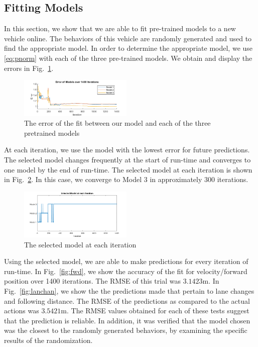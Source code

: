 \documentclass[letterpaper, 10 pt, conference]{ieeeconf}  %
\begin{document}
\subsection{Fitting Models}

In this section, we show that we are able to fit pre-trained models to a new vehicle online. The behaviors of this vehicle are randomly generated and used to find the appropriate model. In order to determine the appropriate model, we use \eqref{eq:pnorm} with each of the three pre-trained models. We obtain and display the errors in Fig.~\ref{fig:error}.

\begin{figure}[ht]
    \includegraphics[width=0.48\textwidth]{fig/modelerror.png}
    \caption{The error of the fit between our model and each of the three pretrained models} \label{fig:error}
\end{figure}

At each iteration, we use the model with the lowest error for future predictions. The selected model changes frequently at the start of run-time and converges to one model by the end of run-time. The selected model at each iteration is shown in Fig.~\ref{fig:select}. In this case, we converge to Model $3$ in approximately 300 iterations.

\begin{figure}[ht]
    \includegraphics[width=0.48\textwidth]{fig/modelselect.png}
    \caption{The selected model at each iteration} \label{fig:select}
\end{figure}

Using the selected model, we are able to make predictions for every iteration of run-time. In Fig.~\ref{fig:fwd}, we show the accuracy of the fit for velocity/forward position over 1400 iterations. The RMSE of this trial was $3.1423$m. In Fig.~\ref{fig:lanchan}, we show the the predictions made that pertain to lane changes and following distance. The RMSE of the predictions as compared to the actual actions was $3.5421$m. The RMSE values obtained for each of these tests suggest that the prediction is reliable. In addition, it was verified that the model chosen was the closest to the randomly generated behaviors, by examining the specific results of the randomization.
\end{document}
